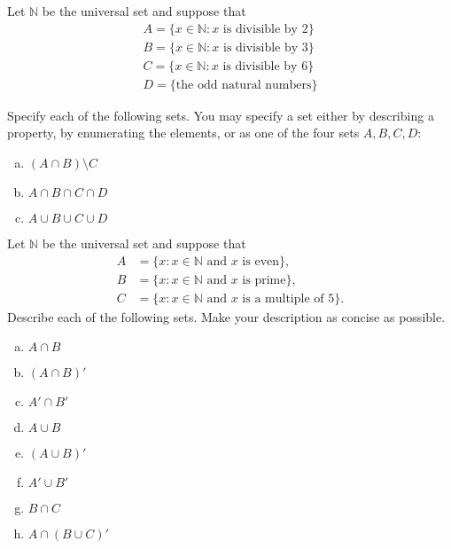 \begin{exercise}{20}
Let ${\mathbb N}$ be the universal set and suppose that
\begin{align*}
A = \{ x \in {\mathbb N} : x \text{ is divisible by 2}\} \\ 
B = \{ x \in {\mathbb N} : x \text{ is divisible by 3}\} \\ 
C = \{ x \in {\mathbb N} : x \text{ is divisible by 6}\} \\
D = \{\text{the odd natural numbers}\}
\end{align*} 

\noindent
Specify each of the following sets. You may specify a set either by describing a property, by enumerating the elements, or as one of the four sets $A, B, C, D$:
\begin{multicols}{2}
\begin{enumerate}[(a)]
\item
$(A \cap B) \setminus C$
\item
$A \cap B \cap C \cap D$
\item
$A \cup B \cup C \cup D$

\end{enumerate}
\end{multicols}
\end{exercise}

\begin{exercise}{21}
Let ${\mathbb N}$ be the universal set and suppose that
\begin{align*}
A & = \{ x : \mbox{$x \in {\mathbb N}$ and $x$ is even} \}, \\
B & = \{x : \mbox{$x \in {\mathbb N}$ and $x$ is prime}\}, \\
C & = \{ x : \mbox{$x \in {\mathbb N}$ and $x$ is a multiple of $5$}\}.
\end{align*}
Describe each of the following sets. Make your description as concise as possible.
\begin{multicols}{2}
\begin{enumerate}[(a)]

\item
$A \cap B$

\item
$(A \cap B)'$

\item
$A' \cap B'$

\item
$A \cup B$

\item
$(A \cup B)'$

\item
$A' \cup B'$


\item
$B \cap C$

\item
$A \cap (B \cup C)'$

\end{enumerate}
\end{multicols}
\end{exercise} 


